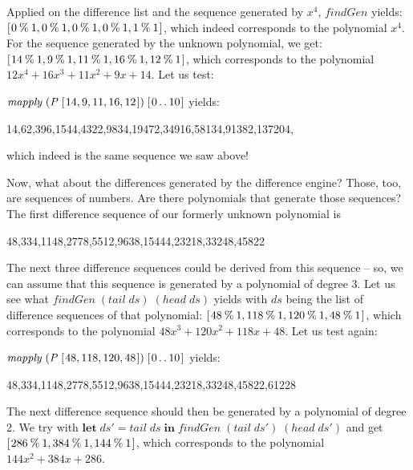 \documentclass[tikz]{scrreprt}
\newcommand{\Conid}[1]{\mathit{#1}}
\newcommand{\Varid}[1]{\mathit{#1}}
\begin{document}
Applied on the difference list and the sequence
generated by $x^4$, \ensuremath{\Varid{findGen}} yields:
\ensuremath{[\mskip1.5mu \mathrm{0}\mathbin{\%}\mathrm{1},\mathrm{0}\mathbin{\%}\mathrm{1},\mathrm{0}\mathbin{\%}\mathrm{1},\mathrm{0}\mathbin{\%}\mathrm{1},\mathrm{1}\mathbin{\%}\mathrm{1}\mskip1.5mu]},
which indeed corresponds to the polynomial $x^4$. 
For the sequence generated by the unknown polynomial,
we get:
\ensuremath{[\mskip1.5mu \mathrm{14}\mathbin{\%}\mathrm{1},\mathrm{9}\mathbin{\%}\mathrm{1},\mathrm{11}\mathbin{\%}\mathrm{1},\mathrm{16}\mathbin{\%}\mathrm{1},\mathrm{12}\mathbin{\%}\mathrm{1}\mskip1.5mu]},
which corresponds to the polynomial
$12x^4 + 16x^3 + 11x^2 + 9x + 14$.
Let us test:

\ensuremath{\Varid{mapply}\;(\Conid{P}\;[\mskip1.5mu \mathrm{14},\mathrm{9},\mathrm{11},\mathrm{16},\mathrm{12}\mskip1.5mu])\;[\mskip1.5mu \mathrm{0}\mathinner{\ldotp\ldotp}\mathrm{10}\mskip1.5mu]} yields:

14,62,396,1544,4322,9834,19472,34916,58134,91382,137204,

which indeed is the same sequence we saw above!

Now, what about the differences generated
by the difference engine? Those, too, are sequences
of numbers. Are there polynomials
that generate those sequences?
The first difference sequence of our formerly unknown polynomial is

48,334,1148,2778,5512,9638,15444,23218,33248,45822

The next three difference sequences could be derived
from this sequence -- so, we can assume that this sequence
is generated by a polynomial of degree 3. Let us see
what \ensuremath{\Varid{findGen}\;(\Varid{tail}\;\Varid{ds})\;(\Varid{head}\;\Varid{ds})} yields with \ensuremath{\Varid{ds}}
being the list of difference sequences of that polynomial:
\ensuremath{[\mskip1.5mu \mathrm{48}\mathbin{\%}\mathrm{1},\mathrm{118}\mathbin{\%}\mathrm{1},\mathrm{120}\mathbin{\%}\mathrm{1},\mathrm{48}\mathbin{\%}\mathrm{1}\mskip1.5mu]}, 
which corresponds to the polynomial 
$48x^3 + 120x^2 + 118x + 48$.
Let us test again:

\ensuremath{\Varid{mapply}\;(\Conid{P}\;[\mskip1.5mu \mathrm{48},\mathrm{118},\mathrm{120},\mathrm{48}\mskip1.5mu])\;[\mskip1.5mu \mathrm{0}\mathinner{\ldotp\ldotp}\mathrm{10}\mskip1.5mu]} yields:

48,334,1148,2778,5512,9638,15444,23218,33248,45822,61228

The next difference sequence should then be generated
by a polynomial of degree 2. We try with
\ensuremath{\mathbf{let}\;\Varid{ds'}\mathrel{=}\Varid{tail}\;\Varid{ds}\;\mathbf{in}\;\Varid{findGen}\;(\Varid{tail}\;\Varid{ds'})\;(\Varid{head}\;\Varid{ds'})} and get
\ensuremath{[\mskip1.5mu \mathrm{286}\mathbin{\%}\mathrm{1},\mathrm{384}\mathbin{\%}\mathrm{1},\mathrm{144}\mathbin{\%}\mathrm{1}\mskip1.5mu]},
which corresponds to the polynomial 
$144x^2 + 384x + 286$.
\end{document}
